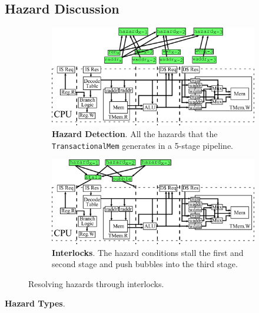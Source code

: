 \subsection{Hazard Discussion}
\begin{figure}[htb]
\centering
  \begin{subfigure}[t]{0.8\textwidth}
  \centering
  \includegraphics[width=\textwidth]{figures/pipelinehazard.pdf}
  \caption{{\bf Hazard Detection}. All the hazards that
    the {\tt TransactionalMem} generates in a 5-stage pipeline.}
  \label{fig:haz}
  \end{subfigure}
  \begin{subfigure}[t]{0.8\textwidth}
  \vspace{20pt}
  \centering
  \includegraphics[width=\textwidth]{figures/pipelineinterlock.pdf}
  \caption{{\bf Interlocks}. The hazard conditions stall the
  first and second stage and push bubbles into the third stage.}
  \label{fig:int}
  \end{subfigure}
\caption{Resolving hazards through interlocks.}
\label{fig:hazint}
\end{figure}

{\bf Hazard Types}. 

